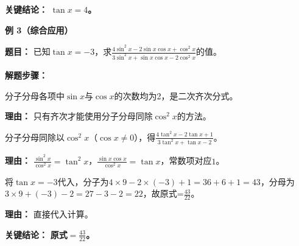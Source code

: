 \begin{examplebox}
	\textbf{\textcolor{CExample}{关键结论：}}
	\textbf{$\tan x=4$。}

	\medskip
	\textbf{\textcolor{CExample}{例 3（综合应用）}}

	\textbf{\textcolor{CExample}{题目：}}
	已知$\tan x=-3$，求$\displaystyle\frac{4\sin^2 x-2\sin x\cos x+\cos^2 x}{3\sin^2 x+\sin x\cos x-2\cos^2 x}$的值。

	\textbf{\textcolor{CExample}{解题步骤：}}
	\begin{description}[style=nextline, leftmargin=2.8em, labelsep=0.5em, itemsep=0.45em]
		\item[\textbf{第一步（判齐次）：}]分子分母各项中$\sin x$与$\cos x$的次数均为2，是二次齐次分式。
			\par\textbf{理由：} 只有齐次才能使用分子分母同除$\cos^2 x$的方法。

		\item[\textbf{第二步（同除化切）：}]分子分母同除以$\cos^2 x$（$\cos x\neq0$），得$\displaystyle\frac{4\tan^2 x-2\tan x+1}{3\tan^2 x+\tan x-2}$。
			\par\textbf{理由：} $\frac{\sin^2 x}{\cos^2 x}=\tan^2 x$，$\frac{\sin x\cos x}{\cos^2 x}=\tan x$，常数项对应$1$。

		\item[\textbf{第三步（代入求值）：}]将$\tan x=-3$代入，分子为$4\times9-2\times(-3)+1=36+6+1=43$，分母为$3\times9+(-3)-2=27-3-2=22$，故原式=$\displaystyle\frac{43}{22}$。
			\par\textbf{理由：} 直接代入计算。
	\end{description}

	\textbf{\textcolor{CExample}{关键结论：}}
	\textbf{原式$=\displaystyle\frac{43}{22}$。}
\end{examplebox}
